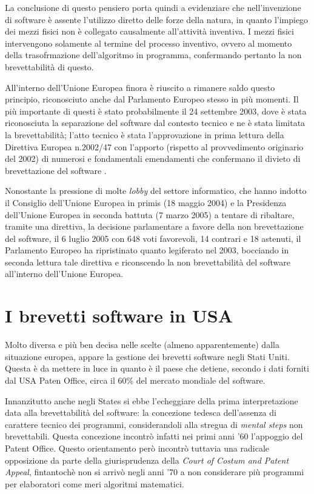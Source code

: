 La conclusione di questo pensiero porta quindi a evidenziare che nell'invenzione di software è assente l'utilizzo diretto delle forze della natura, in quanto l'impiego dei mezzi fisici non è collegato causalmente all'attività inventiva. I mezzi fisici intervengono solamente al termine del processo inventivo, ovvero al momento della trasofrmazione dell'algoritmo in programma, confermando pertanto la non brevettabilità di questo.

All'interno dell'Unione Europea finora è riuscito a rimanere saldo questo principio, riconosciuto anche dal Parlamento Europeo stesso in più momenti. Il più importante di questi è stato probabilmente il 24 settembre 2003, dove è stata riconosciuta la separazione del software dal contesto tecnico e ne è stata limitata la brevettabilità; l'atto tecnico è stata l'approvazione in prima lettura della Direttiva Europea n.2002/47 con l'apporto (rispetto al provvedimento originario del 2002) di numerosi e fondamentali emendamenti che confermano il divieto di brevettazione del software .

Nonostante la pressione di molte \textit{lobby} del settore informatico, che hanno indotto il Consiglio dell'Unione Europea in primis (18 maggio 2004) e la Presidenza dell'Unione Europea in seconda battuta (7 marzo 2005) a tentare di ribaltare, tramite una direttiva, la decisione parlamentare a favore della non brevettazione del software, il 6 luglio 2005 con 648 voti favorevoli, 14 contrari e 18 astenuti, il Parlamento Europeo ha ripristinato quanto legiferato nel 2003, bocciando in seconda lettura tale direttiva e riconscendo la non brevettabilità del software all'interno dell'Unione Europea.

\section{I brevetti software in USA}

Molto diversa e più ben decisa nelle scelte (almeno apparentemente) dalla situazione europea, appare la gestione dei brevetti software negli Stati Uniti. Questa è da mettere in luce in quanto è il paese che detiene, secondo i dati forniti dal USA Paten Office, circa il 60\% del mercato mondiale del software.

Innanzitutto anche negli States si ebbe l'echeggiare della prima interpretazione data alla brevettabilità del software: la concezione tedesca dell'assenza di carattere tecnico dei programmi, considerandoli alla stregua di \textit{mental steps} non brevettabili. Questa concezione incontrò infatti nei primi anni '60 l'appoggio del Patent Office. Questo orientamento però incontrò tuttavia una radicale opposizione da parte della giurisprudenza della \textit{Court of Costum and Patent Appeal}, fintantochè non si arrivò negli anni '70 a non considerare più programmi per elaboratori come meri algoritmi matematici.

